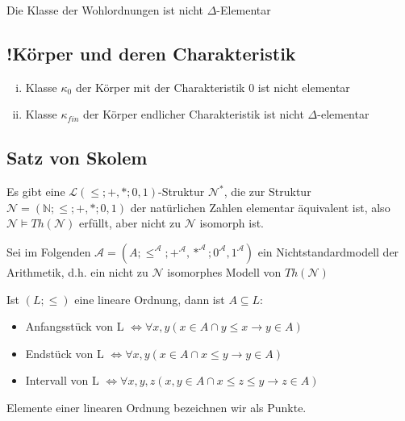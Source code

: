 \documentclass[12pt,a4paper]{article} %
\begin{document}
	Die Klasse der Wohlordnungen ist nicht $\Delta$-Elementar
	
	\subsection{!Körper und deren Charakteristik}
	\begin{enumerate}[(i)]
		\item Klasse $\kappa_0$ der Körper mit der Charakteristik 0 ist nicht elementar
		\item Klasse $\kappa_{fin}$ der Körper endlicher Charakteristik ist nicht $\Delta$-elementar
	\end{enumerate}

	\subsection{Satz von Skolem}
	Es gibt eine $\mathcal{L}(\le; +, *; 0, 1)$-Struktur $\mathcal{N}^*$, die zur Struktur $\mathcal{N} = (\mathbb{N}; \le; +, *; 0, 1)$ der natürlichen Zahlen elementar äquivalent ist, also $\mathcal{N} \vDash Th(\mathcal{N})$ erfüllt, aber nicht zu $\mathcal{N}$ isomorph ist.
	
	Sei im Folgenden $\mathcal{A} = (A; \le^{\mathcal{A}}; +^{\mathcal{A}}, *^{\mathcal{A}}; 0^{\mathcal{A}}, 1^{\mathcal{A}})$ ein Nichtstandardmodell der Arithmetik, d.h. ein nicht zu $\mathcal{N}$ isomorphes Modell von $Th(\mathcal{N})$ 
	
	Ist $(L; \le)$ eine lineare Ordnung, dann ist $A \subseteq L$:
	\begin{itemize}
		\item Anfangsstück von L $\Leftrightarrow \forall x, y (x \in A \cap y \le x  \rightarrow y \in A)$ 
		\item Endstück von L $\Leftrightarrow \forall x, y (x \in A \cap x \le y  \rightarrow y \in A)$ 
		\item Intervall von L $\Leftrightarrow \forall x, y, z (x, y \in A \cap x \le z \le y  \rightarrow z \in A)$ 
	\end{itemize}
	Elemente einer linearen Ordnung bezeichnen wir als Punkte.
\end{document}
